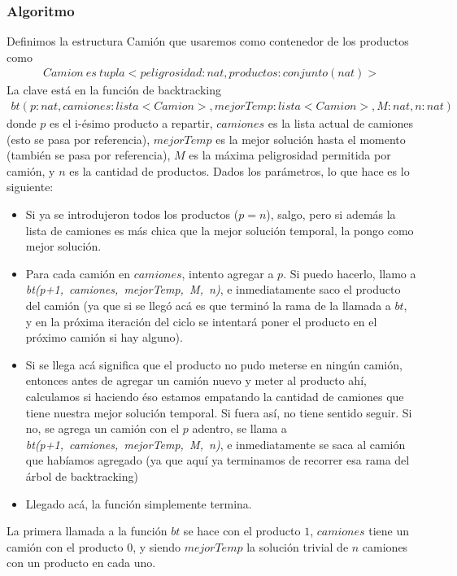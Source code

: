 \subsubsection{Algoritmo}
Definimos la estructura Camión que usaremos como contenedor de los productos como
\begin{align*}
Camion \: es \: tupla<peligrosidad : nat, productos : conjunto(nat)>
\end{align*}
La clave está en la función de backtracking
\begin{align*}
bt(p : nat, camiones : lista<Camion>, mejorTemp : lista<Camion>, M : nat, n : nat)
\end{align*}
donde $p$ es el i-ésimo producto a repartir, $camiones$ es la lista actual de camiones (esto se pasa por referencia), $mejorTemp$ es la mejor solución hasta el momento (también se pasa por referencia), $M$ es la máxima peligrosidad permitida por camión, y $n$ es la cantidad de productos.
Dados los parámetros, lo que hace es lo siguiente: 
\begin{itemize}
\item Si ya se introdujeron todos los productos ($p = n$), salgo, pero si además la lista de camiones es más chica que la mejor solución temporal, la pongo como mejor solución.
\item Para cada camión en $camiones$, intento agregar a $p$. Si puedo hacerlo, llamo a \textit{bt(p+1,~camiones,~mejorTemp,~M,~n)}, e inmediatamente saco el producto del camión (ya que si se llegó acá es que terminó la rama de la llamada a $bt$, y en la próxima iteración del ciclo se intentará poner el producto en el próximo camión si hay alguno).
\item Si se llega acá significa que el producto no pudo meterse en ningún camión, entonces antes de agregar un camión nuevo y meter al producto ahí, calculamos si haciendo éso estamos empatando la cantidad de camiones que tiene nuestra mejor solución temporal. Si fuera así, no tiene sentido seguir. Si no, se agrega un camión con el $p$ adentro, se llama a \textit{bt(p+1,~camiones,~mejorTemp,~M,~n)}, e inmediatamente se saca al camión que habíamos agregado (ya que aquí ya terminamos de recorrer esa rama del árbol de backtracking)
\item Llegado acá, la función simplemente termina.
\end{itemize}
La primera llamada a la función $bt$ se hace con el producto $1$, $camiones$ tiene un camión con el producto $0$, y siendo $mejorTemp$ la solución trivial de $n$ camiones con un producto en cada uno.


